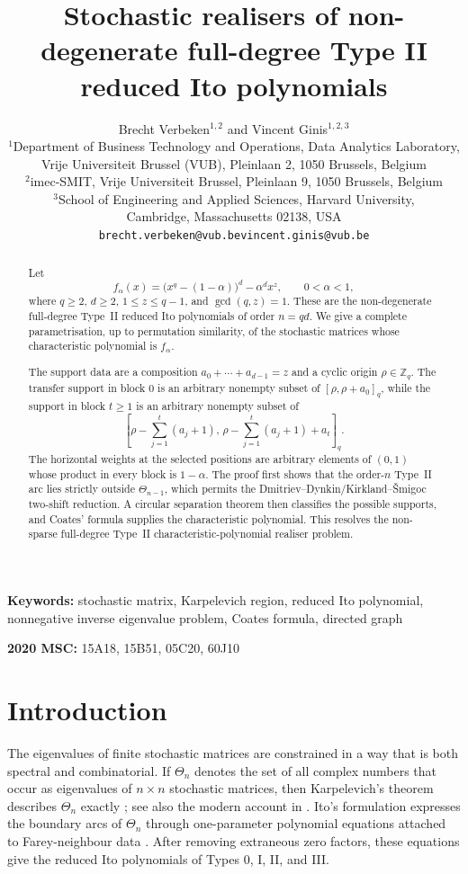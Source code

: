 \documentclass[11pt]{article}
\title{Stochastic realisers of non-degenerate full-degree Type II reduced Ito polynomials}
\author{
Brecht Verbeken$^{1,2}$ and Vincent Ginis$^{1,2,3}$\\[0.5em]
$^1$Department of Business Technology and Operations, Data Analytics Laboratory,\\
Vrije Universiteit Brussel (VUB), Pleinlaan 2, 1050 Brussels, Belgium\\
$^2$imec-SMIT, Vrije Universiteit Brussel, Pleinlaan 9, 1050 Brussels, Belgium\\
$^3$School of Engineering and Applied Sciences, Harvard University,\\
Cambridge, Massachusetts 02138, USA\\[0.5em]
\texttt{brecht.verbeken@vub.be}\quad \texttt{vincent.ginis@vub.be}
}
\date{}
\theoremstyle{definition}
\theoremstyle{remark}
\begin{document}
\maketitle

\begin{abstract}
Let
\[
        f_\alpha(x)=\bigl(x^q-(1-\alpha)\bigr)^d-\alpha^d x^z,
        \qquad 0<\alpha<1,
\]
where $q\ge2$, $d\ge2$, $1\le z\le q-1$, and $\gcd(q,z)=1$. These are the non-degenerate full-degree Type~II reduced Ito polynomials of order $n=qd$. We give a complete parametrisation, up to permutation similarity, of the stochastic matrices whose characteristic polynomial is $f_\alpha$.

The support data are a composition $a_0+\cdots+a_{d-1}=z$ and a cyclic origin $\rho\in\mathbb Z_q$. The transfer support in block $0$ is an arbitrary nonempty subset of $[\rho,\rho+a_0]_q$, while the support in block $t\ge1$ is an arbitrary nonempty subset of
\[
\left[
 \rho-\sum_{j=1}^t(a_j+1),\,
 \rho-\sum_{j=1}^t(a_j+1)+a_t
\right]_q .
\]
The horizontal weights at the selected positions are arbitrary elements of $(0,1)$ whose product in every block is $1-\alpha$. The proof first shows that the order-$n$ Type~II arc lies strictly outside $\Theta_{n-1}$, which permits the Dmitriev--Dynkin/Kirkland--\v Smigoc two-shift reduction. A circular separation theorem then classifies the possible supports, and Coates' formula supplies the characteristic polynomial. This resolves the non-sparse full-degree Type~II characteristic-polynomial realiser problem.
\end{abstract}

\noindent\textbf{Keywords:} stochastic matrix, Karpelevich region, reduced Ito polynomial, nonnegative inverse eigenvalue problem, Coates formula, directed graph

\noindent\textbf{2020 MSC:} 15A18, 15B51, 05C20, 60J10

\section{Introduction}

The eigenvalues of finite stochastic matrices are constrained in a way that is both spectral and combinatorial.  If $\Theta_n$ denotes the set of all complex numbers that occur as eigenvalues of $n\times n$ stochastic matrices, then Karpelevich's theorem describes $\Theta_n$ exactly \cite{Karpelevich1951}; see also the modern account in \cite{KirklandLaffeySmigoc2020}.  Ito's formulation expresses the boundary arcs of $\Theta_n$ through one-parameter polynomial equations attached to Farey-neighbour data \cite{Ito1997}.  After removing extraneous zero factors, these equations give the reduced Ito polynomials of Types 0, I, II, and III.
\end{document}
